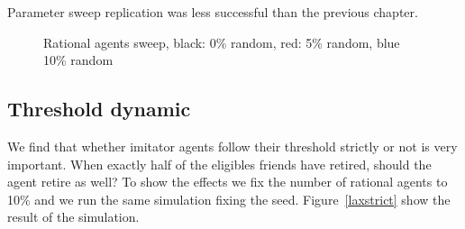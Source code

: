 \documentclass[runningheads,a4paper]{llncs}
\begin{document}
Parameter sweep replication was less successful than the previous chapter.

\begin{figure}
\centering

\caption{Rational agents sweep, black: 0\% random, red: 5\% random, blue 10\% random}
\label{figure5}
\end{figure}




\subsection{Threshold dynamic}

We find that whether imitator agents follow their threshold strictly or not is very important.
When exactly half of the eligibles friends have retired, should the agent retire as well?
To show the effects we fix the number of rational agents to 10\% and we run the same simulation fixing the seed.
Figure~\ref{laxstrict} show the result of the simulation.
\end{document}
